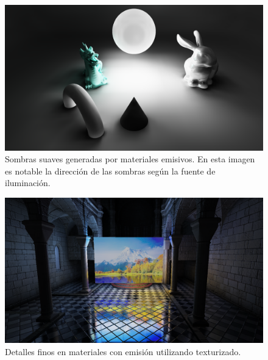 \begin{figure}[H]
	\centering
	\includegraphics[width=\linewidth]{media/finals/area_shadows.png}
	\caption{Sombras suaves generadas por materiales emisivos. En esta imagen es notable la dirección de las sombras según la fuente de iluminación.}
	\label{fig:areashadows}
\end{figure}


\begin{figure}[H]
	\centering
	\includegraphics[width=\linewidth]{media/finals/fine_emissive.png}
	\caption{Detalles finos en materiales con emisión utilizando texturizado.}
	\label{fig:fine_emissive}
\end{figure}

